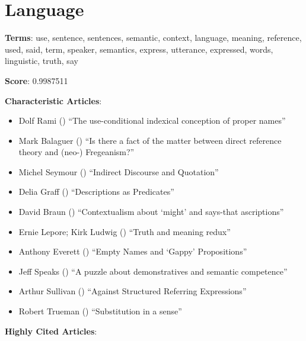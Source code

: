 \documentclass[
  10pt,
  letterpaper,
  DIV=11,
  numbers=noendperiod,
  twoside]{scrartcl}
\providecommand{\tightlist}{%
  \setlength{\itemsep}{0pt}\setlength{\parskip}{0pt}}\usepackage{longtable,booktabs,array}
\begin{document}
\section{Language}\label{language}

\textbf{Terms}: use, sentence, sentences, semantic, context, language,
meaning, reference, used, said, term, speaker, semantics, express,
utterance, expressed, words, linguistic, truth, say

\textbf{Score}: 0.9987511

\textbf{Characteristic Articles}:

\begin{itemize}
\tightlist
\item
  Dolf Rami () ``The
  use-conditional indexical conception of proper names''
\item
  Mark Balaguer () ``Is there a
  fact of the matter between direct reference theory and (neo-)
  Fregeanism?''
\item
  Michel Seymour () ``Indirect
  Discourse and Quotation''
\item
  Delia Graff () ``Descriptions
  as Predicates''
\item
  David Braun () ``Contextualism
  about `might' and says-that ascriptions''
\item
  Ernie Lepore; Kirk Ludwig ()
  ``Truth and meaning redux''
\item
  Anthony Everett () ``Empty
  Names and `Gappy' Propositions''
\item
  Jeff Speaks () ``A puzzle about
  demonstratives and semantic competence''
\item
  Arthur Sullivan () ``Against
  Structured Referring Expressions''
\item
  Robert Trueman ()
  ``Substitution in a sense''
\end{itemize}

\textbf{Highly Cited Articles}:
\end{document}
